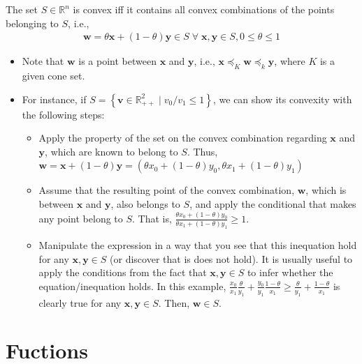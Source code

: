 \documentclass{article}
\begin{document}
The set \(S \in \mathbb{R}^{n}\) is convex iff it contains all convex combinations of the points belonging to \(S\), i.e.,
\begin{align}
    \mathbf{w} = \theta \mathbf{x} + (1-\theta)\mathbf{y} \in S \;\forall\; \mathbf{x}, \mathbf{y} \in S, 0\leq\theta\leq 1
\end{align}
\begin{itemize}
    \item Note that \(\mathbf{w}\) is a point between \(\mathbf{x}\) and \(\mathbf{y}\), i.e., \(\mathbf{x} \preceq_K \mathbf{w} \preceq_k \mathbf{y}\), where \(K\) is a given cone set.
    \item For instance, if \(S = \left\{ \mathbf{v} \in \mathbb{R}_{++}^{2} \mid v_0/v_1 \leq 1 \right\}\), we can show its convexity with the following steps:
    \begin{itemize}
        \item Apply the property of the set on the convex combination regarding \(\mathbf{x}\) and \(\mathbf{y}\), which are known to belong to \(S\). Thus, \(\mathbf{w} = \mathbf{x} + (1-\theta)\mathbf{y} = (\theta x_0 + (1 - \theta)y_0, \theta x_1 + (1 - \theta)y_1)\)
        \item Assume that the resulting point of the convex combination, \(\mathbf{w}\), which is between \(\mathbf{x}\) and \(\mathbf{y}\), also belongs to \(S\), and apply the conditional that makes any point belong to \(S\). That is, \(\frac{\theta x_0 + (1 - \theta)y_0}{\theta x_1 + (1 - \theta)y_1} \geq 1\).
        \item Manipulate the expression in a way that you see that this inequation hold for any \(\mathbf{x}, \mathbf{y} \in S\) (or discover that is does not hold). It is usually useful to apply the conditions from the fact that \(\mathbf{x}, \mathbf{y} \in S\) to infer whether the equation/inequation holds. In this example, \(\frac{x_0}{x_1}\frac{\theta}{y_1} + \frac{y_0}{y_1} \frac{1 - \theta}{x_1} \geq \frac{\theta}{y_1} + \frac{1 - \theta}{x_1}\) is clearly true for any \(\mathbf{x}, \mathbf{y} \in S\). Then, \(\mathbf{w} \in S\).
    \end{itemize}
\end{itemize}

\clearpage
\edef\hmm{\pdfpagewidth=\the\pdfpagewidth \pdfpageheight=\the\pdfpageheight\relax}
\pdfpagewidth=30cm
\pdfpageheight=80cm
\section{Fuctions}
\end{document}
